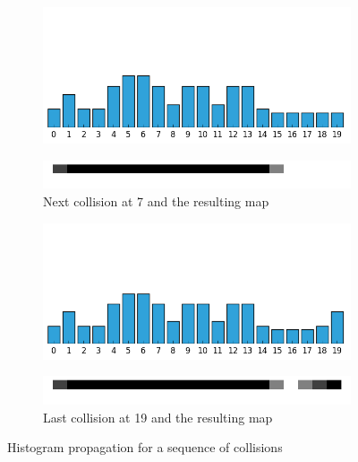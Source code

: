 \begin{exmp}
\begin{figure}
\begin{minipage}{0.48\textwidth}
\centering
\begin{subfigure}{\textwidth}
\centering
\includegraphics[scale=0.4]{./images/ex24/ex24coll7.png}
\end{subfigure}
\begin{subfigure}{\textwidth}
\centering
\includegraphics[scale=0.4]{./images/ex24/ex24wall7.png}
\caption{Next collision at 7 and the resulting map}
\end{subfigure}
\end{minipage}
\begin{minipage}{0.48\textwidth}
\centering
\begin{subfigure}{\textwidth}
\centering
\includegraphics[scale=0.4]{./images/ex24/ex24coll19.png}
\end{subfigure}
\begin{subfigure}{\textwidth}
\centering
\includegraphics[scale=0.4]{./images/ex24/ex24wall19.png}
\caption{Last collision at 19 and the resulting map}
\end{subfigure}
\end{minipage}
\caption[Histogram propagation for a sequence of collision information]{Histogram propagation for a sequence of collisions}
\label{ex24_collisions}
\end{figure}


\end{exmp}
